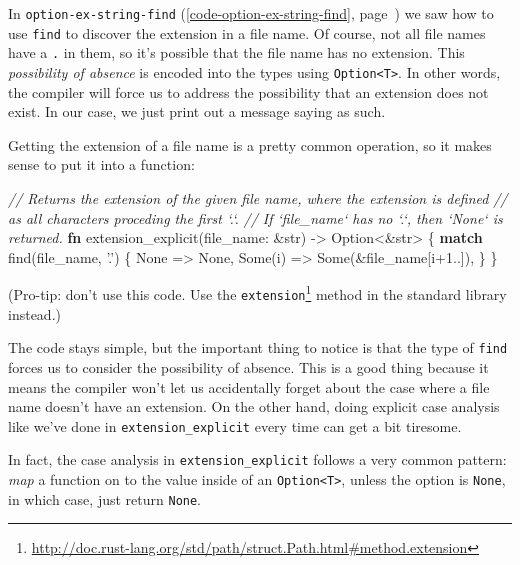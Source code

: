 \documentclass[a4paper,]{book}
\renewcommand*{\hyperref}[2][\ar]{%
  \def\ar{#2}%
  #2 (\autoref{#1}, page~\pageref{#1})}
\newenvironment{Shaded}{\begin{snugshade}}{\end{snugshade}}
\newcommand{\KeywordTok}[1]{\textcolor[rgb]{0.13,0.29,0.53}{\textbf{{#1}}}}
\newcommand{\DataTypeTok}[1]{\textcolor[rgb]{0.13,0.29,0.53}{{#1}}}
\newcommand{\DecValTok}[1]{\textcolor[rgb]{0.00,0.00,0.81}{{#1}}}
\newcommand{\ConstantTok}[1]{\textcolor[rgb]{0.00,0.00,0.00}{{#1}}}
\newcommand{\CharTok}[1]{\textcolor[rgb]{0.31,0.60,0.02}{{#1}}}
\newcommand{\CommentTok}[1]{\textcolor[rgb]{0.56,0.35,0.01}{\textit{{#1}}}}
\newcommand{\NormalTok}[1]{{#1}}
\renewcommand{\href}[2]{#2\footnote{\url{#1}}}
\begin{document}
In \hyperref[code-option-ex-string-find]{\texttt{option-ex-string-find}}
we saw how to use \texttt{find} to discover the extension in a file
name. Of course, not all file names have a \texttt{.} in them, so it's
possible that the file name has no extension. This \emph{possibility of
absence} is encoded into the types using
\texttt{Option\textless{}T\textgreater{}}. In other words, the compiler
will force us to address the possibility that an extension does not
exist. In our case, we just print out a message saying as such.

Getting the extension of a file name is a pretty common operation, so it
makes sense to put it into a function:

\begin{Shaded}
\begin{Highlighting}[]
\CommentTok{// Returns the extension of the given file name, where the extension is defined}
\CommentTok{// as all characters proceding the first `.`.}
\CommentTok{// If `file_name` has no `.`, then `None` is returned.}
\KeywordTok{fn} \NormalTok{extension_explicit(file_name: &}\DataTypeTok{str}\NormalTok{) -> }\DataTypeTok{Option}\NormalTok{<&}\DataTypeTok{str}\NormalTok{> \{}
    \KeywordTok{match} \NormalTok{find(file_name, }\CharTok{'.'}\NormalTok{) \{}
        \ConstantTok{None} \NormalTok{=> }\ConstantTok{None}\NormalTok{,}
        \ConstantTok{Some}\NormalTok{(i) => }\ConstantTok{Some}\NormalTok{(&file_name[i+}\DecValTok{1.}\NormalTok{.]),}
    \NormalTok{\}}
\NormalTok{\}}
\end{Highlighting}
\end{Shaded}

(Pro-tip: don't use this code. Use the
\href{http://doc.rust-lang.org/std/path/struct.Path.html\#method.extension}{\texttt{extension}}
method in the standard library instead.)

The code stays simple, but the important thing to notice is that the
type of \texttt{find} forces us to consider the possibility of absence.
This is a good thing because it means the compiler won't let us
accidentally forget about the case where a file name doesn't have an
extension. On the other hand, doing explicit case analysis like we've
done in \texttt{extension\_explicit} every time can get a bit tiresome.

In fact, the case analysis in \texttt{extension\_explicit} follows a
very common pattern: \emph{map} a function on to the value inside of an
\texttt{Option\textless{}T\textgreater{}}, unless the option is
\texttt{None}, in which case, just return \texttt{None}.
\end{document}
